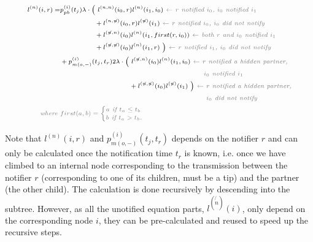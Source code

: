 \documentclass[a4paper,10pt]{article}
\begin{document}
\begin{equation}
\scriptsize
\begin{split}
l^{(n)}(i, r) = &p_{pb}^{(i)}(t_j) \lambda \cdot
\Big(~l^{(n,n)}(i_0,r)l^{(n)}(i_1,i_0) \textit{\color{gray}~$\leftarrow$ $r$ notified $i_0$, $i_0$  notified $i_1$} \\
&~~~~~~~~~~~~~~~+ l^{(n,\not{n})}(i_0,r)l^{(\not{n})}(i_1) \textit{\color{gray}~$\leftarrow$  $r$ notified $i_0$, $i_0$ did not notify} \\
&~~~~~~~~~~~~~~~+l^{(\not{n}, n)}(i_0)l^{(n)}(i_1,first(r,i_0)) \textit{\color{gray}~$\leftarrow$ both $r$ and $i_0$ notified $i_1$} \\
&~~~~~~~~~~~~~~~+ l^{(\not{n},\not{n})}(i_0)l^{(n)}(i_1,r)~\Big) \textit{\color{gray}~$\leftarrow$ $r$ notified $i_1$, $i_0$ did not notify} 
\\
&+ p_{m(o,-)}^{(i)}(t_j,t_r) 2\lambda \cdot
\Big(~l^{(\not{n},n)}(i_0)l^{(n)}(i_1,i_0) \textit{\color{gray}~$\leftarrow$ $r$ notified a hidden partner,} \\
&\textit{\color{gray}~~~~~~~~~~~~~~~~~~~~~~~~~~~~~~~~~~~~~~~~~~~~~~~~~~~~~~~~$i_0$ notified $i_1$} \\
&~~~~~~~~~~~~~~~~~~~~~~~~~~~~~~+ l^{(\not{n},\not{n})}(i_0)l^{(\not{n})}(i_1)~\Big) \textit{\color{gray}~$\leftarrow$ $r$ notified a hidden partner,} \\
&\textit{\color{gray}~~~~~~~~~~~~~~~~~~~~~~~~~~~~~~~~~~~~~~~~~~~~~~~~~~~~~~~~ $i_0$ did not notify}\\
\textit{\color{gray}~where } &\color{gray}first(a,b) = 
\begin{cases}
a \textit{~if $t_a \leq t_b$}\\
b \textit{~if $t_a > t_b$.}
\end{cases} 
 \end{split}
\label{eq:lp-tip-int}
\end{equation}


Note that $l^{(n)}(i, r)$ and $p_{m(o,-)}^{(i)}(t_j,t_r)$ depends on the notifier $r$ and can only be calculated once the notification time $t_r$ is known, i.e. once we have climbed to an internal node corresponding to the transmission between the notifier $r$ (corresponding to one of its children, must be a tip) and the partner (the other child). The calculation is done recursively by descending into the subtree. However, as all the unotified equation parts, $l^{(\not{n})}(i)$, only depend on the corresponding node $i$, they can be pre-calculated and reused to speed up the recursive steps.
\end{document}
